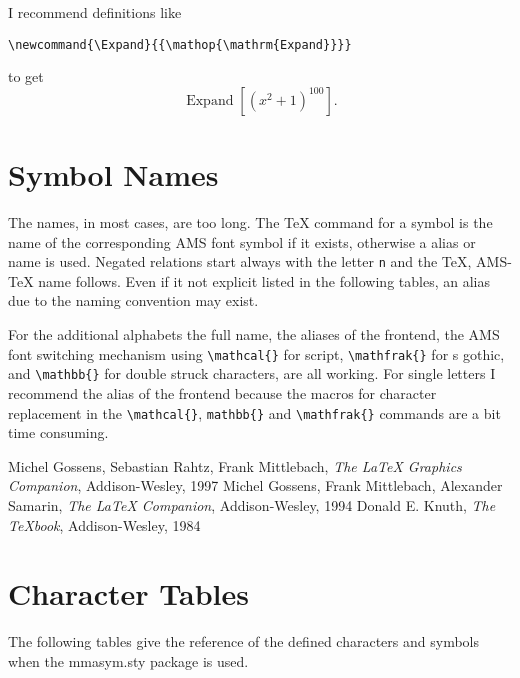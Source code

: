 \documentclass{article}
\begin{document}
I recommend definitions like
\begin{verbatim}
\newcommand{\Expand}{{\mathop{\mathrm{Expand}}}}
\end{verbatim}

\newcommand{\Expand}{{\mathop{\mathrm{Expand}}}}

to get $$\Expand[(x^2+1)^{100}].$$



\section{Symbol Names}

The \MathLogo{} names, in most cases, are too long. The \TeX{}
command for a symbol is the name of the 
corresponding AMS font symbol
if it exists, otherwise a \MathLogo{} alias or name is used.
Negated relations start always with the letter \texttt{n} and
the \TeX{}, AMS-\TeX{} name follows. Even if it not explicit
listed in the following tables, an alias due to the \MathLogo{}
naming convention may exist.

\begin{sloppypar}
For the additional alphabets the full \MathLogo{} name, the aliases
of the frontend, the AMS font switching mechanism using \verb|\mathcal{}|
for script, \verb|\mathfrak{}| for \MathLogo{}s gothic, and
\verb|\mathbb{}| for double struck characters, are all working. For
single letters I recommend the alias of the frontend because the
macros for character replacement in the \verb|\mathcal{}|, \verb|mathbb{}|
and \verb|\mathfrak{}| commands are a bit time consuming.
\end{sloppypar}

\begin{thebibliography}{9}
 Michel Gossens, Sebastian Rahtz, Frank Mittlebach,
                 \textit{The \LaTeX{} Graphics Companion}, Addison-Wesley, 1997
 Michel Gossens, Frank Mittlebach, Alexander Samarin,
                 \textit{The \LaTeX{} Companion}, Addison-Wesley, 1994
 Donald E. Knuth, \textit{The \TeX{}book}, Addison-Wesley, 1984
\end{thebibliography}

\appendix

\section{Character Tables}

The following tables give the reference of the defined characters and symbols
when the \textsf{mmasym.sty} package is used. 
\end{document}
